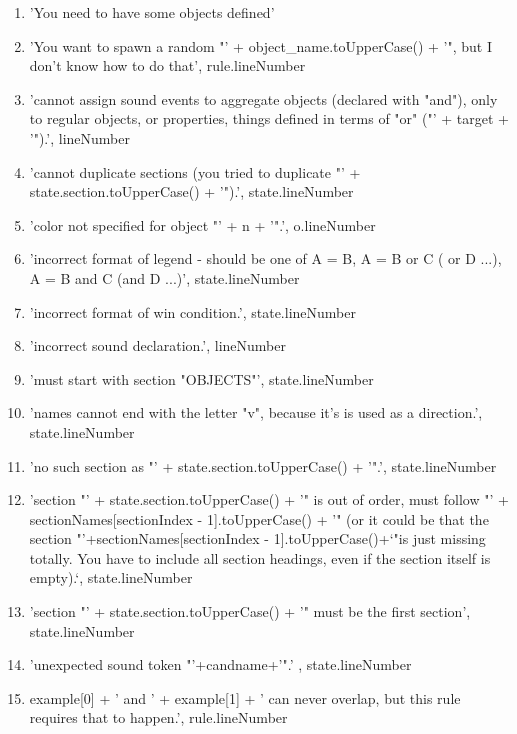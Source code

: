 \begin{enumerate}
    \item 'You need to have some objects defined'
    \item 'You want to spawn a random "' + object\_name.toUpperCase() + '", but I don't know how to do that', rule.lineNumber
    \item 'cannot assign sound events to aggregate objects (declared with "and"), only to regular objects, or properties, things defined in terms of "or" ("' + target + '").', lineNumber
    \item 'cannot duplicate sections (you tried to duplicate "' + state.section.toUpperCase() + '").', state.lineNumber
    \item 'color not specified for object "' + n + '".', o.lineNumber
    \item 'incorrect format of legend - should be one of A = B, A = B or C ( or D ...), A = B and C (and D ...)', state.lineNumber
    \item 'incorrect format of win condition.', state.lineNumber
    \item 'incorrect sound declaration.', lineNumber
    \item 'must start with section "OBJECTS"', state.lineNumber
    \item 'names cannot end with the letter "v", because it's is used as a direction.', state.lineNumber
    \item 'no such section as "' + state.section.toUpperCase() + '".', state.lineNumber
    \item 'section "' + state.section.toUpperCase() + '" is out of order, must follow  "' + sectionNames[sectionIndex - 1].toUpperCase() + '" (or it could be that the section "'+sectionNames[sectionIndex - 1].toUpperCase()+`"is just missing totally.  You have to include all section headings, even if the section itself is empty).`, state.lineNumber
    \item 'section "' + state.section.toUpperCase() + '" must be the first section', state.lineNumber
    \item 'unexpected sound token "'+candname+'".' , state.lineNumber
    \item example[0] + ' and ' + example[1] + ' can never overlap, but this rule requires that to happen.', rule.lineNumber
\end{enumerate}

